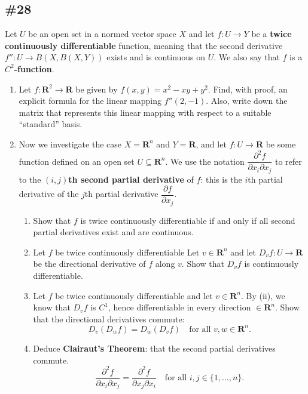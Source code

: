 \documentclass{article}
\newcommand{\R}{\mathbf{R}}
\theoremstyle{plain} %
\numberwithin{thm}{section} %
\theoremstyle{definition}
\begin{document}
        \subsection{\#28}

        Let $U$ be an open set in a normed vector space $X$ and let $f:U\rightarrow Y$ be a \textbf{twice continuously differentiable} function, meaning that the second derivative $f'':U\rightarrow B(X,B(X,Y))$ exists and is continuous on $U$. We also say that $f$ is a \textbf{$C^2$-function}.
        \begin{enumerate}[label=(\alph*)]
            \item Let $f:\R^2\rightarrow \R$ be given by $f(x,y)=x^2-xy+y^2$. Find, with proof, an explicit formula for the linear mapping $f''(2,-1)$. Also, write down the matrix that represents this linear mapping with respect to a suitable ``standard'' basis.
            
            \item Now we investigate the case $X=\R^n$ and $Y=\R$, and let $f:U\rightarrow \R$ be some function defined on an open set $U\subseteq \R^n$. We use the notation $\dfrac{\partial^2 f}{\partial x_i\partial x_j}$ to refer to the \textbf{$(i,j)$th second partial derivative} of $f$: this is the $i$th partial derivative of the $j$th partial derivative $\dfrac{\partial f}{\partial x_j}$.
    

            \begin{enumerate}[label=(\roman*)]
                \item Show that $f$ is twice continuously differentiable if and only if all second partial derivatives exist and are continuous.

                \item Let $f$ be twice continuously differentiable Let $v\in \R^n$ and let $D_vf:U\rightarrow \R$ be the directional derivative of $f$ along $v$. Show that $D_vf$ is continuously differentiable.

                \item Let $f$ be twice continuously differentiable and let $v\in \R^n$. By (ii), we know that $D_vf$ is $C^1$, hence differentiable in every direction $\in \R^n$. Show that the directional derivatives commute:
                    \[ D_v(D_wf) = D_w(D_vf) \quad \text{for all $v,w\in \R^n$.} \]
                \item Deduce \textbf{Clairaut's Theorem}: that the second partial derivatives commute.
                \[ \dfrac{\partial^2 f}{\partial x_i\partial x_j} = \dfrac{\partial^2 f}{\partial x_j\partial x_i} \quad \text{for all $i,j\in \{1,\ldots,n\}$.} \]
            \end{enumerate}
        \end{enumerate}
\end{document}
